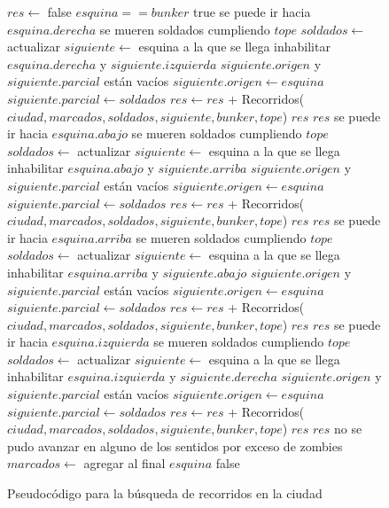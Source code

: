 \begin{figure}[!ht]
\begin{codebox}
\li $res \leftarrow$ false
\li \If $esquina == bunker$
\li 		\Do \Return true
		\End
\li 	\If se puede ir hacia $esquina.derecha$
\li 		\Do \If se mueren soldados cumpliendo $tope$
\li				\Do 
					$soldados \leftarrow$ actualizar
				\End
\li			$siguiente \leftarrow$ esquina a la que se llega
\li			inhabilitar $esquina.derecha$ y $siguiente.izquierda$
\li			\If $siguiente.origen$ y $siguiente.parcial$ están vacíos
\li				\Do
					$siguiente.origen \leftarrow esquina$
\li					$siguiente.parcial \leftarrow soldados$
				\End
\li			$res \leftarrow res$ + {\sc Recorridos}($ciudad,marcados,soldados,siguiente,bunker,tope$)
\li			\If $res$ 
\li				\Do \Return $res$
				\End
		\End
\li 	\If se puede ir hacia $esquina.abajo$
\li 		\Do \If se mueren soldados cumpliendo $tope$
\li				\Do 
					$soldados \leftarrow$ actualizar
				\End
\li			$siguiente \leftarrow$ esquina a la que se llega
\li			inhabilitar $esquina.abajo$ y $siguiente.arriba$
\li			\If $siguiente.origen$ y $siguiente.parcial$ están vacíos
\li				\Do
					$siguiente.origen \leftarrow esquina$
\li					$siguiente.parcial \leftarrow soldados$
				\End
\li			$res \leftarrow res$ + {\sc Recorridos}($ciudad,marcados,soldados,siguiente,bunker,tope$)
\li			\If $res$ 
\li				\Do \Return $res$
				\End
		\End
\li 	\If se puede ir hacia $esquina.arriba$
\li 		\Do \If se mueren soldados cumpliendo $tope$
\li				\Do 
					$soldados \leftarrow$ actualizar
				\End
\li			$siguiente \leftarrow$ esquina a la que se llega
\li			inhabilitar $esquina.arriba$ y $siguiente.abajo$
\li			\If $siguiente.origen$ y $siguiente.parcial$ están vacíos
\li				\Do
					$siguiente.origen \leftarrow esquina$
\li					$siguiente.parcial \leftarrow soldados$
				\End
\li			$res \leftarrow res$ + {\sc Recorridos}($ciudad,marcados,soldados,siguiente,bunker,tope$)
\li			\If $res$ 
\li				\Do \Return $res$
				\End
		\End		
\li 	\If se puede ir hacia $esquina.izquierda$
\li 		\Do \If se mueren soldados cumpliendo $tope$
\li				\Do 
					$soldados \leftarrow$ actualizar
				\End
\li			$siguiente \leftarrow$ esquina a la que se llega
\li			inhabilitar $esquina.izquierda$ y $siguiente.derecha$
\li			\If $siguiente.origen$ y $siguiente.parcial$ están vacíos
\li				\Do
					$siguiente.origen \leftarrow esquina$
\li					$siguiente.parcial \leftarrow soldados$
				\End
\li			$res \leftarrow res$ + {\sc Recorridos}($ciudad,marcados,soldados,siguiente,bunker,tope$)
\li			\If $res$ 
\li				\Do \Return $res$
				\End
		\End
\li \If no se pudo avanzar en alguno de los sentidos por exceso de zombies
\li 		\Do 	$marcados \leftarrow$ agregar al final $esquina$
		\End
\li \Return false
\end{codebox} 
\caption{Pseudocódigo para la búsqueda de recorridos en la ciudad}\label{code:zombieland.rec}
\end{figure}
\FloatBarrier

